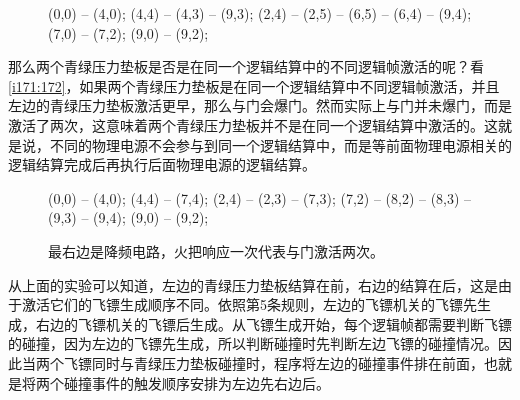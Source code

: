 \begin{figure}[!ht]
  \centering
  \begin{tikzpictureC}[TRsch]

     (0,0) -- (4,0);
     (4,4) -- (4,3) -- (9,3);
     (2,4) -- (2,5) -- (6,5) -- (6,4) -- (9,4);
     (7,0) -- (7,2);
     (9,0) -- (9,2);
  \end{tikzpictureC}
  \caption{}
  \label{i169:170}
\end{figure}

那么两个青绿压力垫板是否是在同一个逻辑结算中的不同逻辑帧激活的呢？看\autoref{i171:172}，如果两个青绿压力垫板是在同一个逻辑结算中不同逻辑帧激活，并且左边的青绿压力垫板激活更早，那么与门会爆门。然而实际上与门并未爆门，而是激活了两次，这意味着两个青绿压力垫板并不是在同一个逻辑结算中激活的。这就是说，不同的物理电源不会参与到同一个逻辑结算中，而是等前面物理电源相关的逻辑结算完成后再执行后面物理电源的逻辑结算。

\begin{figure}[!ht]
  \centering
  \begin{tikzpictureC}[TRsch]

     (0,0) -- (4,0);
     (4,4) -- (7,4);
     (2,4) -- (2,3) -- (7,3);
     (7,2) -- (8,2) -- (8,3) -- (9,3) -- (9,4);
     (9,0) -- (9,2);
  \end{tikzpictureC}
  \caption{}
  \caption{最右边是降频电路，火把响应一次代表与门激活两次。}
  \label{i171:172}
\end{figure}

从上面的实验可以知道，左边的青绿压力垫板结算在前，右边的结算在后，这是由于激活它们的飞镖生成顺序不同。依照第5条规则，左边的飞镖机关的飞镖先生成，右边的飞镖机关的飞镖后生成。从飞镖生成开始，每个逻辑帧都需要判断飞镖的碰撞，因为左边的飞镖先生成，所以判断碰撞时先判断左边飞镖的碰撞情况。因此当两个飞镖同时与青绿压力垫板碰撞时，程序将左边的碰撞事件排在前面，也就是将两个碰撞事件的触发顺序安排为左边先右边后。

